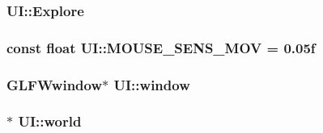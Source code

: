 \subsubsection[{\texorpdfstring{Explore}{Explore}}]{ U\+I\+::\+Explore}\hypertarget{namespace_u_i_a5724793eec5b84e087210957c562dad6}{}\label{namespace_u_i_a5724793eec5b84e087210957c562dad6}
\subsubsection[{\texorpdfstring{M\+O\+U\+S\+E\+\_\+\+S\+E\+N\+S\+\_\+\+M\+OV}{MOUSE_SENS_MOV}}]{\setlength{\rightskip}{0pt plus 5cm}const float U\+I\+::\+M\+O\+U\+S\+E\+\_\+\+S\+E\+N\+S\+\_\+\+M\+OV = 0.\+05f}\hypertarget{namespace_u_i_a3acb427a17b83fb6a34d117989a7c435}{}\label{namespace_u_i_a3acb427a17b83fb6a34d117989a7c435}
\subsubsection[{\texorpdfstring{window}{window}}]{\setlength{\rightskip}{0pt plus 5cm}G\+L\+F\+Wwindow$\ast$ U\+I\+::window}\hypertarget{namespace_u_i_ac05ba8c1833c723ee85c762399654d3e}{}\label{namespace_u_i_ac05ba8c1833c723ee85c762399654d3e}
\subsubsection[{\texorpdfstring{world}{world}}]{$\ast$ U\+I\+::world}\hypertarget{namespace_u_i_a84dc8a978d6b785608801d14bac894b7}{}\label{namespace_u_i_a84dc8a978d6b785608801d14bac894b7}
